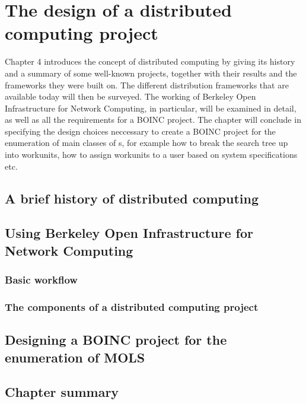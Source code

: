 \chapter{The design of a distributed computing project}
\vspace{-2em}
\minitoc

Chapter 4 introduces the concept of distributed computing by  giving its history and a summary of some well-known projects, together with their results and the frameworks they were built on. The different distribution frameworks that are available today will then be surveyed.  The working of Berkeley Open Infrastructure for Network Computing, in particular, will be examined in detail, as well as all the requirements for a BOINC project.  The chapter will conclude in specifying the design choices neccessary to create a  BOINC project for the enumeration of main classes of \lat s, for example how to break the search tree up into workunits, how to assign workunits to a user based on system specifications etc.

\section{A brief history of distributed computing}

\section{Using Berkeley Open Infrastructure for Network Computing}

\subsection{Basic workflow}

\subsection{The components of a distributed computing project}

\section{Designing a BOINC project for the enumeration of MOLS}






\section{Chapter summary}